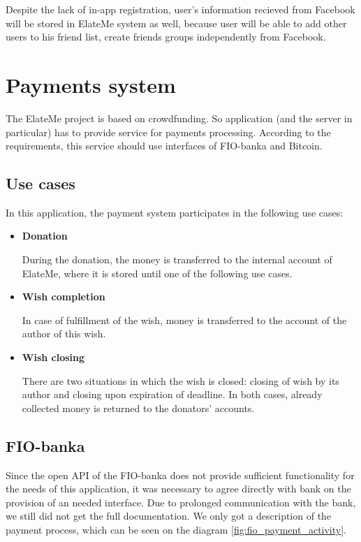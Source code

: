 Despite the lack of in-app registration, user's information recieved from Facebook will be stored in ElateMe system
as well, because user will be able to add other users to his friend list, create friends groups independently from
Facebook.



\newcommand{\uitem}[1]{
\item \textbf{#1} \par
}
\newcommand{\aitem}[1]{
\item \textbf{#1} \par
}
\section{Payments system}
The ElateMe project is based on crowdfunding. So application (and the server in particular) has to provide service for
payments processing. According to the requirements, this service should use interfaces of FIO-banka and Bitcoin.

\subsection{Use cases}
In this application, the payment system participates in the following use cases:

\begin{itemize}
\uitem{Donation}
During the donation, the money is transferred to the internal account of ElateMe, where it is stored until one of
the following use cases.

\uitem{Wish completion}
In case of fulfillment of the wish, money is transferred to the account of the author of this wish.

\uitem{Wish closing}
There are two situations in which the wish is closed: closing of wish by its author and closing upon expiration of
deadline. In both cases, already collected money is returned to the donators' accounts.
\end{itemize}

\subsection{FIO-banka}
Since the open \ac{API} of the FIO-banka \cite{fio} does not provide sufficient functionality for the needs of this
application, it was necessary to agree directly with bank on the provision of an needed interface. Due to prolonged
communication with the bank, we still did not get the full documentation. We only got a description of the payment
process, which can be seen on the diagram \ref{fig:fio_payment_activity}.

